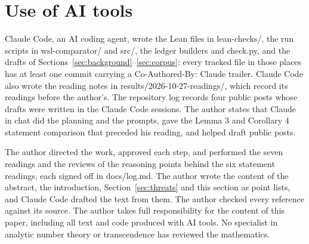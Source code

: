 \section{Use of AI tools}\label{sec:ai}

Claude Code, an AI coding agent, wrote the Lean files in lean-checks/, the run scripts in wsl-comparator/ and src/, the ledger builders and check.py, and the drafts of Sections~\ref{sec:background}--\ref{sec:corpus}: every tracked file in those places has at least one commit carrying a Co-Authored-By: Claude trailer.
Claude Code also wrote the reading notes in results/2026-10-27-readings/, which record its readings before the author's.
The repository log records four public posts whose drafts were written in the Claude Code sessions.
The author states that Claude in chat did the planning and the prompts, gave the Lemma 3 and Corollary 4 statement comparison that preceded his reading, and helped draft public posts.

The author directed the work, approved each step, and performed the seven readings and the reviews of the reasoning points behind the six statement readings, each signed off in docs/log.md.
The author wrote the content of the abstract, the introduction, Section~\ref{sec:threats} and this section as point lists, and Claude Code drafted the text from them.
The author checked every reference against its source.
The author takes full responsibility for the content of this paper, including all text and code produced with AI tools.
No specialist in analytic number theory or transcendence has reviewed the mathematics.
